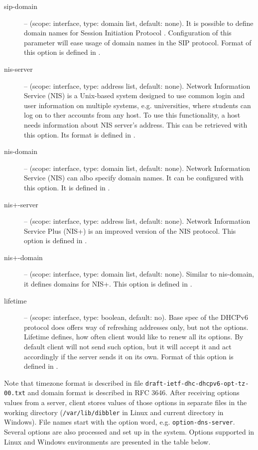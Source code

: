 \begin{description}
 \item[sip-domain] -- (scope: interface, type: domain list, default:
	    none). It is possible to define domain names for Session
	    Initiation Protocol \cite{rfc3263}. Configuration of this
	    parameter will ease usage of domain names in the SIP
	    protocol. Format of this option is defined in
	    \cite{rfc3319}.
 \item[nis-server] -- (scope: interface, type: address list, default:
	    none). Network Information Service (NIS) is a Unix-based
	    system designed to use common login and user information on
	    multiple systems, e.g. universities, where students can log
	    on to ther accounts from any host. To use this
	    functionality, a host needs information about NIS server's
	    address. This can be retrieved with this option. Its format
	    is defined in \cite{rfc3898}.
 \item[nis-domain] -- (scope: interface, type: domain list, default:
	    none). Network Information Service (NIS) can albo specify
	    domain names. It can be configured with this option. It is
	    defined in \cite{rfc3898}.
 \item[nis+-server] -- (scope: interface, type: address list, default:
	    none). Network Information Service Plus (NIS+) is an
	    improved version of the NIS protocol. This option is defined
	    in \cite{rfc3898}.
 \item[nis+-domain] -- (scope: interface, type: domain list, default:
	    none). Similar to nis-domain, it defines domains for
	    NIS+. This option is defined in \cite{rfc3898}.
 \item[lifetime] -- (scope: interface, type: boolean, default: no). Base
	    spec of the DHCPv6 protocol does offers way of refreshing
	    addresses only, but not the options. Lifetime defines, how
	    often client would like to renew all its options. By default
	    client will not send such option, but it will accept it and
	    act accordingly if the server sends it on its own. Format of
	    this option is defined in \cite{draft-lifetime}.
\end{description}

Note that timezone format is described in file \verb+draft-ietf-dhc-dhcpv6-opt-tz-00.txt+
and domain format is described in RFC 3646. After receiving options
values from a server, client stores values of those options in separate
files in the working directory (\verb+/var/lib/dibbler+ in Linux and
current directory in Windows). File names start with the option word,
e.g. \verb+option-dns-server+. Several options are also processed and
set up in the system. Options supported in Linux and Windows
environments are presented in the table below.


